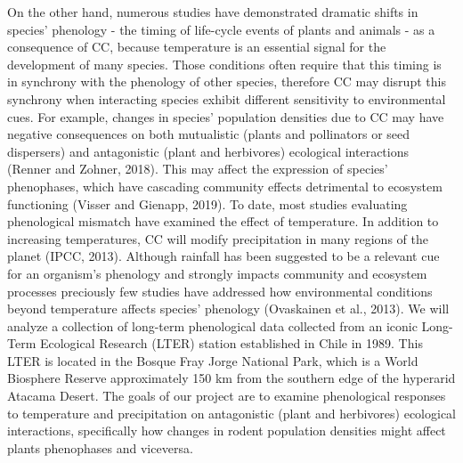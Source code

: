 \documentclass[a4paper]{article}
\begin{document}
On the other hand, numerous studies have demonstrated dramatic shifts in species' phenology - the timing of life-cycle events of plants and animals - as a consequence of CC, because temperature is an essential signal for the development of many species. Those conditions often require that this timing is in synchrony with the phenology of other species, therefore CC may disrupt this synchrony when interacting species exhibit different sensitivity to environmental cues. For example, changes in species' population densities due to CC may have negative consequences on both mutualistic (plants and pollinators or seed dispersers) and antagonistic (plant and herbivores) ecological interactions (Renner and Zohner, 2018). This may affect the expression of species' phenophases, which have cascading community effects detrimental to ecosystem functioning (Visser and Gienapp, 2019). To date, most studies evaluating phenological mismatch have examined the effect of temperature. In addition to increasing temperatures, CC will modify precipitation in many regions of the planet (IPCC, 2013). Although rainfall has been suggested to be a relevant cue for an organism's phenology and strongly impacts community and ecosystem processes preciously few studies have addressed how environmental conditions beyond temperature affects species' phenology (Ovaskainen et al., 2013). We will analyze a collection of long-term phenological data collected from an iconic Long-Term Ecological Research (LTER) station established in Chile in 1989. This LTER is located in the Bosque Fray Jorge National Park, which is a World Biosphere Reserve approximately 150 km from the southern edge of the hyperarid Atacama Desert. The goals of our project are to examine phenological responses to temperature and precipitation on antagonistic (plant and herbivores) ecological interactions, specifically how changes in rodent population densities might affect plants phenophases and viceversa. 
 
\end{document}
